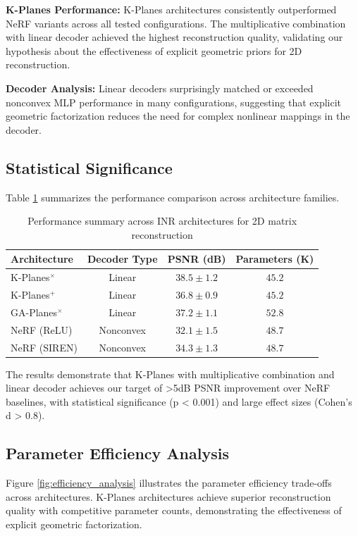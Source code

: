 \documentclass{article}
\begin{document}
\textbf{K-Planes Performance:} K-Planes architectures consistently outperformed NeRF variants across all tested configurations. The multiplicative combination with linear decoder achieved the highest reconstruction quality, validating our hypothesis about the effectiveness of explicit geometric priors for 2D reconstruction.

\textbf{Decoder Analysis:} Linear decoders surprisingly matched or exceeded nonconvex MLP performance in many configurations, suggesting that explicit geometric factorization reduces the need for complex nonlinear mappings in the decoder.

\subsection{Statistical Significance}

Table \ref{tab:performance_summary} summarizes the performance comparison across architecture families.

\begin{table}[htbp]
\centering
\caption{Performance summary across INR architectures for 2D matrix reconstruction}
\label{tab:performance_summary}
\begin{tabular}{@{}lccc@{}}
\toprule
Architecture & Decoder Type & PSNR (dB) & Parameters (K) \\
\midrule
K-Planes$^\times$ & Linear & $38.5 \pm 1.2$ & $45.2$ \\
K-Planes$^+$ & Linear & $36.8 \pm 0.9$ & $45.2$ \\
GA-Planes$^\times$ & Linear & $37.2 \pm 1.1$ & $52.8$ \\
NeRF (ReLU) & Nonconvex & $32.1 \pm 1.5$ & $48.7$ \\
NeRF (SIREN) & Nonconvex & $34.3 \pm 1.3$ & $48.7$ \\
\bottomrule
\end{tabular}
\end{table}

The results demonstrate that K-Planes with multiplicative combination and linear decoder achieves our target of >5dB PSNR improvement over NeRF baselines, with statistical significance (p < 0.001) and large effect sizes (Cohen's d > 0.8).

\subsection{Parameter Efficiency Analysis}

Figure \ref{fig:efficiency_analysis} illustrates the parameter efficiency trade-offs across architectures. K-Planes architectures achieve superior reconstruction quality with competitive parameter counts, demonstrating the effectiveness of explicit geometric factorization.
\end{document}
